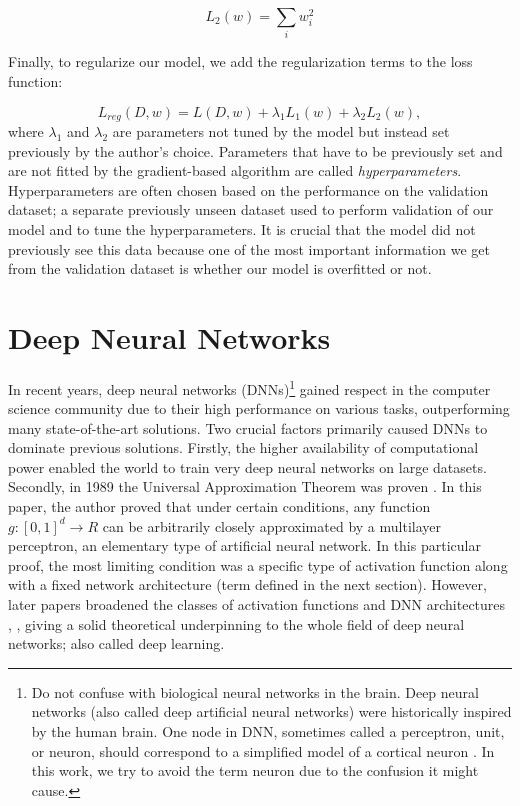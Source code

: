 \begin{equation}
L_2(w) = \sum_i w_i^2
\end{equation}

Finally, to regularize our model, we add the regularization terms to the loss function:

\begin{equation}
L_{reg}(D, w) = L(D, w) + \lambda_1 L_1(w) + \lambda_2 L_2(w),
\end{equation}
where $\lambda_1$ and $\lambda_2$ are parameters not tuned by the model but instead set previously by the author’s choice. Parameters that have to be previously set and are not fitted by the gradient-based algorithm are called \emph{hyperparameters}. Hyperparameters are often chosen based on the performance on the validation dataset; a separate previously unseen dataset used to perform validation of our model and to tune the hyperparameters. It is crucial that the model did not previously see this data because one of the most important information we get from the validation dataset is whether our model is overfitted or not.


\section{Deep Neural Networks}

In recent years, deep neural networks (DNNs)\footnote{Do not confuse with biological neural networks in the brain. Deep neural networks (also called deep artificial neural networks) were historically inspired by the human brain. One node in DNN, sometimes called a perceptron, unit, or neuron, should correspond to a simplified model of a cortical neuron \citep{rosenblatt1958perceptron}. In this work, we try to avoid the term neuron due to the confusion it might cause.} gained respect in the computer science community due to their high performance on various tasks, outperforming many state-of-the-art solutions. Two crucial factors primarily caused DNNs to dominate previous solutions. Firstly, the higher availability of computational power enabled the world to train very deep neural networks on large datasets. Secondly, in 1989 the Universal Approximation Theorem was proven \citep{cybenko1989approximation}. In this paper, the author proved that under certain conditions, any function $g: [0, 1]^d \to R$ can be arbitrarily closely approximated by a multilayer perceptron, an elementary type of artificial neural network. In this particular proof, the most limiting condition was a specific type of activation function along with a fixed network architecture (term defined in the next section). However, later papers broadened the classes of activation functions and DNN architectures \citep{leshno1993multilayer}, \citep{heinecke2020refinement} \citep{zhou2020universality}, giving a solid theoretical underpinning to the whole field of deep neural networks; also called deep learning.

